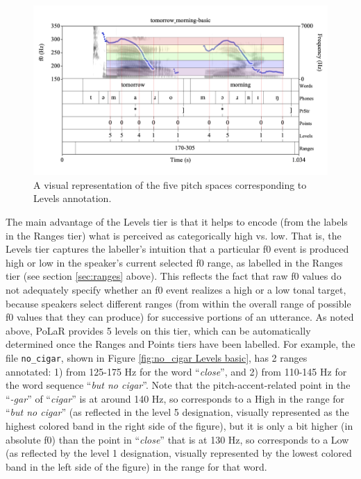 \documentclass[11pt, twoside]{memoir}
\def\langtext#1{\textit{#1}}
\begin{document}
{{\begin{figure}[H]
\centering
\includegraphics[width=.875\linewidth]{Levels-tomorrow_morning-basic.png}
\caption{A visual representation of the five pitch spaces corresponding to Levels annotation.
\label{fig:tomorrow_morning Levels basic}
}
\end{figure}
The main advantage of the Levels tier is that it helps to encode (from the labels in the Ranges tier) what is perceived as categorically high vs. low. That is, the Levels tier captures the labeller’s intuition that a particular f0 event is produced high or low in the speaker’s current selected f0 range, as labelled in the Ranges tier (see section \ref{sec:ranges} above). This reflects the fact that raw f0 values do not adequately specify whether an f0 event realizes a high or a low tonal target, because speakers select different ranges (from within the overall range of possible f0 values that they can produce) for successive portions of an utterance. As noted above, PoLaR provides 5 levels on this tier, which can be automatically determined once the Ranges and Points tiers have been labelled.
For example, the file \texttt{no\_cigar}, shown in Figure \ref{fig:no_cigar Levels basic}, has 2 ranges annotated: 1) from 125-175 Hz for the word “\langtext{close}”, and 2) from 110-145 Hz for the word sequence “\langtext{but no cigar}”. Note that the pitch-accent-related point in the “\langtext{-gar}” of “\langtext{cigar}” is at around 140 Hz, so corresponds to a High in the range for “\langtext{but no cigar}” (as reflected in the level 5 designation, visually represented as the highest colored band in the right side of the figure), but it is only a bit higher (in absolute f0) than the point in “\langtext{close}” that is at 130 Hz, so corresponds to a Low (as reflected by the level 1 designation, visually represented by the lowest colored band in the left side of the figure) in the range for that word.
}}
\end{document}
